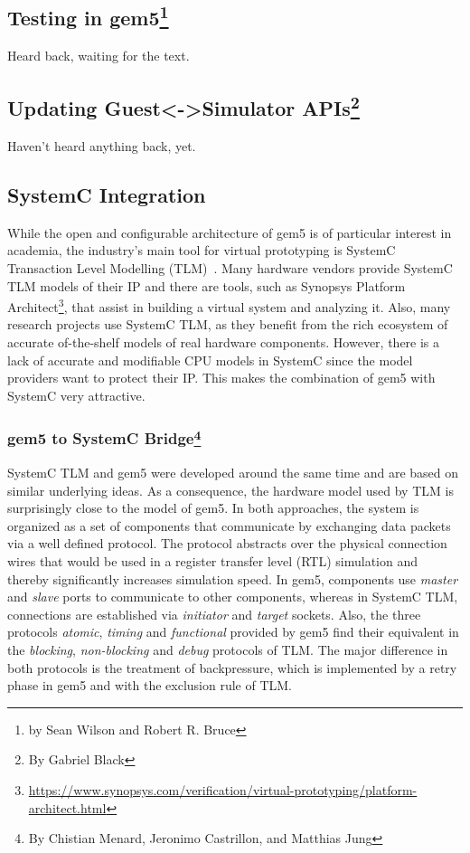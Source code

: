 \subsection[Testing in gem5]{Testing in gem5\footnote{by Sean Wilson and Robert R. Bruce}}

Heard back, waiting for the text.

\subsection[Updating Guest<->Simulator APIs]{Updating Guest<->Simulator APIs\footnote{By Gabriel Black}}

Haven't heard anything back, yet.

\subsection[SystemC Integration]{SystemC Integration}

While the open and configurable architecture of gem5 is of particular interest
in academia, the industry's main tool for virtual prototyping is SystemC
Transaction Level Modelling (TLM)~\cite{systemc_ieee11}. Many hardware vendors
provide SystemC TLM models of their IP and there are tools, such as Synopsys
Platform Architect\footnote{\url{https://www.synopsys.com/verification/virtual-prototyping/platform-architect.html}},
that assist in building a virtual system and analyzing it. Also, many research
projects use SystemC TLM, as they benefit from the rich ecosystem of accurate
of-the-shelf models of real hardware components. However, there is a lack of
accurate and modifiable CPU models in SystemC since the model providers want to
protect their IP. This makes the combination of gem5 with SystemC very
attractive.

\subsubsection[gem5 to SystemC Bridge]{gem5 to SystemC Bridge\footnote{By Chistian Menard, Jeronimo Castrillon, and Matthias Jung}}

SystemC TLM and gem5 were developed around the same time and are based on
similar underlying ideas. As a consequence, the hardware model used by TLM is
surprisingly close to the model of gem5. In both approaches, the system is
organized as a set of components that communicate by exchanging data packets
via a well defined protocol. The protocol abstracts over the physical
connection wires that would be used in a register transfer level (RTL)
simulation and thereby significantly increases simulation speed. In gem5,
components use \emph{master} and \emph{slave} ports to communicate to other
components, whereas in SystemC TLM, connections are established via
\emph{initiator} and \emph{target} sockets. Also, the three protocols
\emph{atomic}, \emph{timing} and \emph{functional} provided by gem5 find their
equivalent in the \emph{blocking}, \emph{non-blocking} and \emph{debug}
protocols of TLM. The major difference in both protocols is the treatment of
backpressure, which is implemented by a retry phase in gem5 and with the
exclusion rule of TLM.

